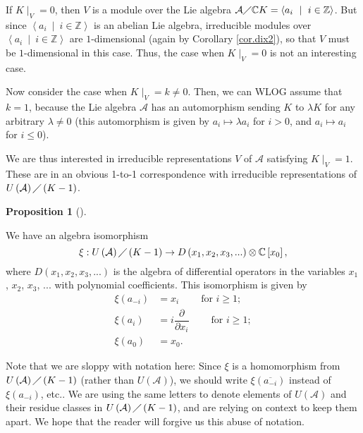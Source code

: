 \documentclass
[numbers=enddot,12pt,final,onecolumn,german,notitlepage]{scrartcl}%
\theoremstyle{definition}
\newtheorem{prop}[theo]{Proposition}
\newenvironment{proposition}[1][]
{\begin{prop}[#1]\begin{leftbar}}
{\end{leftbar}\end{prop}}
\begin{document}
If $K\mid_{V}=0$, then $V$ is a module over the Lie algebra $\mathcal{A}%
\diagup\mathbb{C}K=\left\langle a_{i}\ \mid\ i\in\mathbb{Z}\right\rangle $.
But since $\left\langle a_{i}\ \mid\ i\in\mathbb{Z}\right\rangle $ is an
abelian Lie algebra, irreducible modules over $\left\langle a_{i}\ \mid
\ i\in\mathbb{Z}\right\rangle $ are $1$-dimensional (again by Corollary
\ref{cor.dix2}), so that $V$ must be $1$-dimensional in this case. Thus, the
case when $K\mid_{V}=0$ is not an interesting case.

Now consider the case when $K\mid_{V}=k\neq0$. Then, we can WLOG assume that
$k=1$, because the Lie algebra $\mathcal{A}$ has an automorphism sending $K$
to $\lambda K$ for any arbitrary $\lambda\neq0$ (this automorphism is given by
$a_{i}\mapsto\lambda a_{i}$ for $i>0$, and $a_{i}\mapsto a_{i}$ for $i\leq0$).

We are thus interested in irreducible representations $V$ of $\mathcal{A}$
satisfying $K\mid_{V}=1$. These are in an obvious 1-to-1 correspondence with
irreducible representations of $U\left(  \mathcal{A}\right)  \diagup\left(
K-1\right)  $.

\begin{proposition}
\label{prop.K-1}We have an algebra isomorphism%
\[
\xi:U\left(  \mathcal{A}\right)  \diagup\left(  K-1\right)  \rightarrow
D\left(  x_{1},x_{2},x_{3},...\right)  \otimes\mathbb{C}\left[  x_{0}\right]
,
\]
where $D\left(  x_{1},x_{2},x_{3},...\right)  $ is the algebra of differential
operators in the variables $x_{1}$, $x_{2}$, $x_{3}$, $...$ with polynomial
coefficients. This isomorphism is given by%
\begin{align*}
\xi\left(  a_{-i}\right)   &  =x_{i}\ \ \ \ \ \ \ \ \ \ \text{for }i\geq1;\\
\xi\left(  a_{i}\right)   &  =i\dfrac{\partial}{\partial x_{i}}%
\ \ \ \ \ \ \ \ \ \ \text{for }i\geq1;\\
\xi\left(  a_{0}\right)   &  =x_{0}.
\end{align*}

\end{proposition}

Note that we are sloppy with notation here: Since $\xi$ is a homomorphism from
$U\left(  \mathcal{A}\right)  \diagup\left(  K-1\right)  $ (rather than
$U\left(  \mathcal{A}\right)  $), we should write $\xi\left(  \overline
{a_{-i}}\right)  $ instead of $\xi\left(  a_{-i}\right)  $, etc.. We are using
the same letters to denote elements of $U\left(  \mathcal{A}\right)  $ and
their residue classes in $U\left(  \mathcal{A}\right)  \diagup\left(
K-1\right)  $, and are relying on context to keep them apart. We hope that the
reader will forgive us this abuse of notation.
\end{document}

